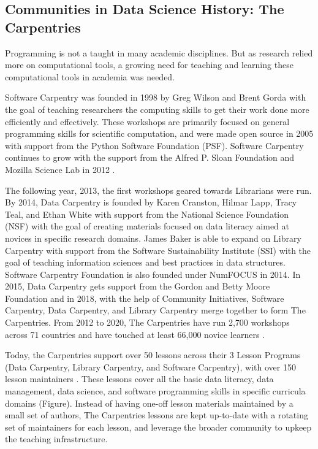 \documentclass[010-intro.tex]{subfiles}
\begin{document}
    \subsection{Communities in Data Science History: The Carpentries}
    
        Programming is not a taught in many academic disciplines.
        But as research relied more on computational tools,
        a growing need for teaching and learning these computational tools in academia was needed.

        Software Carpentry was founded in 1998 by Greg Wilson and Brent Gorda with the goal of
        teaching researchers the computing skills to get their work done more efficiently and effectively.
        These workshops are primarily focused on general programming skills for scientific computation,
        and were made open source in 2005 with support from the Python Software Foundation (PSF).
        Software Carpentry continues to grow with the support from the Alfred P. Sloan Foundation and Mozilla Science Lab in 2012
        \cite{CarpentriesHowWe, jordanCarpentries2020Annual}.


        The following year, 2013, the first workshops geared towards Librarians were run.
        By 2014, Data Carpentry is founded by Karen Cranston, Hilmar Lapp, Tracy Teal, and Ethan White
        with support from the National Science Foundation (NSF)
        with the goal of creating materials focused on data literacy aimed at novices in specific research domains.
        James Baker is able to expand on Library Carpentry with support from the Software Sustainability Institute (SSI)
        with the goal of teaching information sciences and best practices in data structures.
        Software Carpentry Foundation is also founded under NumFOCUS in 2014.
        In 2015, Data Carpentry gets support from the Gordon and Betty Moore Foundation and
        in 2018, with the help of Community Initiatives, Software Carpentry, Data Carpentry, and Library Carpentry
        merge together to form The Carpentries.
        From 2012 to 2020, The Carpentries have run
        2,700 workshops across 71 countries and have touched at least 66,000 novice learners
        \cite{CarpentriesHowWe, jordanCarpentries2020Annual}.
        
        Today, the Carpentries support over 50 lessons across their 3 Lesson Programs
        (Data Carpentry, Library Carpentry, and Software Carpentry),
        with over 150 lesson maintainers
        \cite{chenPointContactEach}.
        These lessons cover all the basic data literacy, data management, data science, and software programming
        skills in specific curricula domains (Figure).
        Instead of having one-off lesson materials maintained by a small set of authors,
        The Carpentries lessons are kept up-to-date with a rotating set of maintainers for each lesson,
        and leverage the broader community to upkeep the teaching infrastructure.
        
\end{document}
